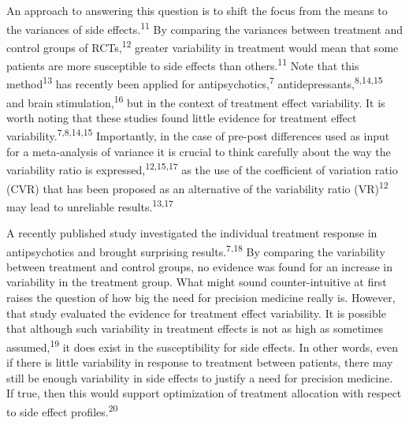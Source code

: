 \documentclass[
  9pt,
  english,
  ,jou,floatsintext]{apa6}
\begin{document}
An approach to answering this question is to shift the focus from the
means to the variances of side effects.\textsuperscript{11} By comparing the
variances between treatment and control groups of RCTs,\textsuperscript{12}
greater variability in treatment would mean that some patients are more
susceptible to side effects than others.\textsuperscript{11} Note that this
method\textsuperscript{13} has recently been applied for
antipsychotics,\textsuperscript{7} antidepressants,\textsuperscript{8,14,15} and brain stimulation,\textsuperscript{16} but in
the context of treatment effect variability. It is worth noting that these
studies found little evidence for treatment effect
variability.\textsuperscript{7,8,14,15}
Importantly, in the case of pre-post differences used as input for a
meta-analysis of variance it is crucial to think carefully about the way
the variability ratio is expressed,\textsuperscript{12,15,17} as the use of the coefficient of variation ratio (CVR)
that has been proposed as an alternative of the variability ratio
(VR)\textsuperscript{12} may lead to unreliable results.\textsuperscript{13,17}

A recently published study investigated the individual treatment
response in antipsychotics and brought surprising
results.\textsuperscript{7,18} By comparing the
variability between treatment and control groups, no evidence was found
for an increase in variability in the treatment group. What might sound
counter-intuitive at first raises the question of how big the need for
precision medicine really is. However, that study evaluated the evidence
for treatment effect variability. It is possible that although such
variability in treatment effects is not as high as sometimes assumed,\textsuperscript{19} it does exist in the susceptibility for side effects. In
other words, even if there is little variability in response to treatment
between patients, there may still be enough variability in side effects to
justify a need for precision medicine. If true, then this would support
optimization of treatment allocation with respect to side effect
profiles.\textsuperscript{20}
\end{document}
